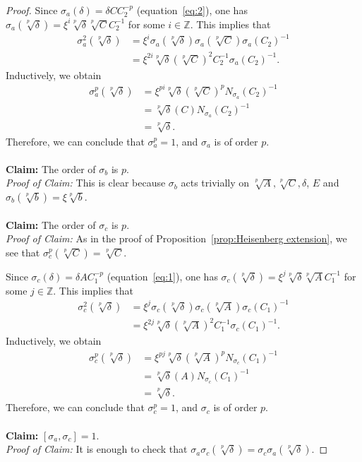 \documentclass[12pt,leqno]{amsart}
\theoremstyle{plain}
\theoremstyle{definition}
\newcommand{\Z}{{\mathbb Z}}
\begin{document}
\begin{proof}
Since $\sigma_a(\delta)=\delta C C_2^{-p}$ (equation~\eqref{eq:2}), one has $\sigma_a(\sqrt[p]{\delta})=\xi^i \sqrt[p]{\delta} \sqrt[p]{C} C_2^{-1}$ for some $i\in \Z$. This implies that
\[
\begin{aligned}
\sigma_a^2(\sqrt[p]{\delta})&= \xi^i\sigma_a(\sqrt[p]{\delta}) \sigma_a(\sqrt[p]{C}) \sigma_a(C_2)^{-1}\\
&= \xi^{2i} \sqrt[p]{\delta} (\sqrt[p]{C})^2 C_2^{-1}\sigma_a(C_2)^{-1}.
\end{aligned}
\]
Inductively, we obtain
\[
\begin{aligned}
\sigma_a^{p}(\sqrt[p]{\delta})&= \xi^{pi}\sqrt[p]{\delta}(\sqrt[p]{C})^p N_{\sigma_a}(C_2)^{-1}\\
&= \sqrt[p]{\delta}(C )N_{\sigma_a}(C_2)^{-1}\\
& =\sqrt[p]{\delta}. 
\end{aligned}
\]
Therefore, we can conclude that $\sigma_a^p=1$, and $\sigma_a$ is of order $p$. 
\\
\\
{\bf Claim:} The order of $\sigma_b$ is $p$.\\
{\it Proof of Claim:} This is clear because $\sigma_b$ acts trivially on $\sqrt[p]{A},\sqrt[p]{C}, \delta$, $E$ and $\sigma_b(\sqrt[p]{b})=\xi\sqrt[p]{b}$.
\\
\\
{\bf Claim:} The order of $\sigma_c$ is $p$.\\
{\it Proof of Claim:} As in the proof of Proposition~\ref{prop:Heisenberg extension}, we see that $\sigma_c^p(\sqrt[p]{C})=\sqrt[p]{C}$.
 
Since $\sigma_c(\delta)=\delta A C_1^{-p}$ (equation~\eqref{eq:1}), one has $\sigma_c(\sqrt[p]{\delta})=\xi^j \sqrt[p]{\delta} \sqrt[p]{A} C_1^{-1}$ for some $j\in \Z$. This implies that
\[
\begin{aligned}
\sigma_c^2(\sqrt[p]{\delta})&= \xi^j\sigma_c(\sqrt[p]{\delta}) \sigma_c(\sqrt[p]{A}) \sigma_c(C_1)^{-1}\\
&= \xi^{2j} \sqrt[p]{\delta} (\sqrt[p]{A})^2 C_1^{-1}\sigma_c(C_1)^{-1}.
\end{aligned}
\]
Inductively, we obtain
\[
\begin{aligned}
\sigma_c^{p}(\sqrt[p]{\delta})&= \xi^{pj}\sqrt[p]{\delta}(\sqrt[p]{A})^p N_{\sigma_c}(C_1)^{-1}\\
&= \sqrt[p]{\delta}(A )N_{\sigma_c}(C_1)^{-1}\\
& = \sqrt[p]{\delta}.
\end{aligned}
\]
Therefore, we can conclude that $\sigma_c^p=1$, and $\sigma_c$ is of order $p$.   
\\
\\
{\bf Claim:} $[\sigma_a,\sigma_c]=1$.\\
{\it Proof of Claim:}  
It is enough to check that $\sigma_a\sigma_c(\sqrt[p]{\delta})=\sigma_c\sigma_a(\sqrt[p]{\delta})$.


\end{proof}
\end{document}

